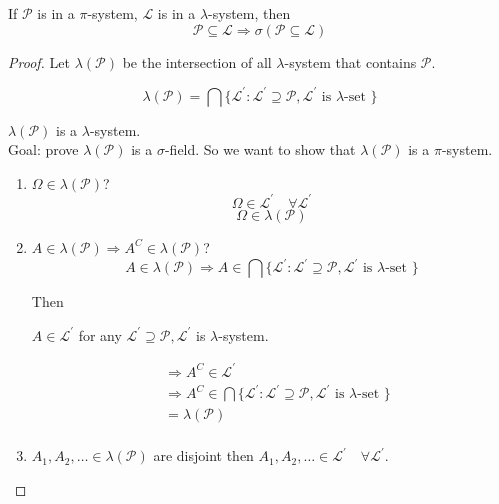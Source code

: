 \documentclass[11pt,fleqn]{book} %
\begin{document}
\begin{theorem}
	If $\mathcal{P}$ is in a $\pi$-system, $\mathcal{L}$ is in a $\lambda$-system, then 
	$$\mathcal{P} \subseteq \mathcal{L} \Rightarrow \sigma(\mathcal{P} \subseteq \mathcal{L}) $$
\end{theorem}

\begin{proof}
	Let $\lambda(\mathcal{P})$ be the intersection of all $\lambda$-system that contains $\mathcal{P}$. 

		$$ \lambda(\mathcal{P}) = \bigcap\{\mathcal{L}^\prime: \mathcal{L}^\prime \supseteq \mathcal{P}, \mathcal{L}^\prime \text{ is }\lambda\text{-set }\}$$

	$\lambda(\mathcal{P})$ is a $\lambda$-system.\\

	Goal: prove $\lambda(\mathcal{P})$ is a $\sigma$-field.
	So we want to show that $\lambda(\mathcal{P})$ is a $\pi$-system.

	\begin{enumerate}
		\item $\Omega \in \lambda(\mathcal{P})$?\\

			$$\Omega \in \mathcal{L}^\prime \quad \forall \mathcal{L}^\prime$$
			$$\Omega \in \lambda(\mathcal{P}) $$

		\item $A \in \lambda(\mathcal{P}) \Rightarrow A^C \in \lambda(\mathcal{P})$?\\

		$$A \in \lambda(\mathcal{P}) \Rightarrow A \in \bigcap\{\mathcal{L}^\prime: \mathcal{L}^\prime \supseteq \mathcal{P}, \mathcal{L}^\prime \text{ is }\lambda\text{-set }\} $$

		Then 

		$A \in \mathcal{L}^\prime$ for any $\mathcal{L}^\prime \supseteq \mathcal{P}, \mathcal{L}^\prime$ is $\lambda$-system. 


				\begin{align*}
					&\Rightarrow A^C \in \mathcal{L}^\prime\\
					&\Rightarrow A^C \in  \bigcap\{\mathcal{L}^\prime: \mathcal{L}^\prime \supseteq \mathcal{P}, \mathcal{L}^\prime \text{ is }\lambda\text{-set }\} \\
					&= \lambda(\mathcal{P})\\
				\end{align*}


		\item $A_1, A_2, \dots \in \lambda(\mathcal{P})$ are disjoint then $A_1, A_2, \dots \in \mathcal{L}^\prime \quad \forall \mathcal{L}^\prime$. 


\end{enumerate}
\end{proof}
\end{document}
